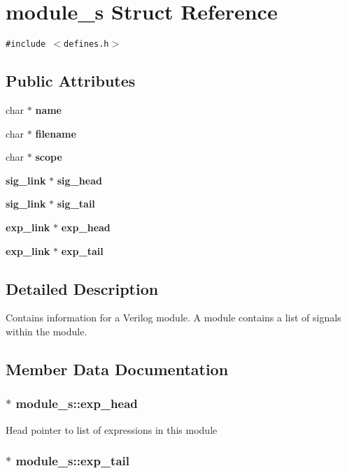 \section{module\_\-s  Struct Reference}
\label{structmodule__s}
{\tt \#include $<$defines.h$>$}

\subsection*{Public Attributes}
\begin{CompactItemize}
\item 
char $\ast$ {\bf name}
\item 
char $\ast$ {\bf filename}
\item 
char $\ast$ {\bf scope}
\item 
{\bf sig\_\-link} $\ast$ {\bf sig\_\-head}
\item 
{\bf sig\_\-link} $\ast$ {\bf sig\_\-tail}
\item 
{\bf exp\_\-link} $\ast$ {\bf exp\_\-head}
\item 
{\bf exp\_\-link} $\ast$ {\bf exp\_\-tail}
\end{CompactItemize}


\subsection{Detailed Description}
Contains information for a Verilog module. A module contains a list of signals within the module. 



\subsection{Member Data Documentation}
\subsubsection{$\ast$ module\_\-s::exp\_\-head}\label{structmodule__s_m5}


Head pointer to list of expressions in this module 
\subsubsection{$\ast$ module\_\-s::exp\_\-tail}\label{structmodule__s_m6}


